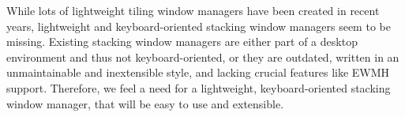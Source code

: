 While lots of lightweight tiling window managers have been created in recent years,
lightweight and keyboard-oriented stacking window managers seem to be missing.
Existing stacking window managers are either part of a desktop environment and thus not keyboard-oriented,
or they are outdated, written in an unmaintainable and inextensible style, and lacking crucial features like EWMH support.
Therefore, we feel a need for a lightweight, keyboard-oriented stacking window manager, that will be easy to use and extensible.



%





